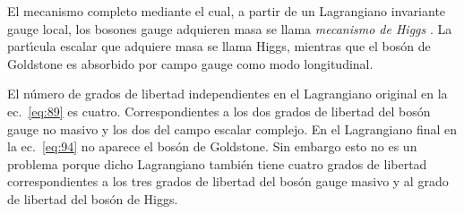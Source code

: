El mecanismo completo mediante el cual, a partir de un Lagrangiano invariante gauge local, los bosones gauge adquieren masa se llama \emph{mecanismo de Higgs} \cite{Higgs:1964pj}. La part\'\i cula escalar que adquiere masa se llama Higgs, mientras que el bos\'on de Goldstone es absorbido por campo gauge como modo longitudinal. 

El n\'umero de grados de libertad independientes en el Lagrangiano original en la ec.~\eqref{eq:89} es cuatro. Correspondientes a los dos grados de libertad del bos\'on gauge no masivo y los dos del campo escalar complejo. En el Lagrangiano final en la ec.~\eqref{eq:94} no aparece el bos\'on de Goldstone. Sin embargo esto no es un problema porque dicho Lagrangiano tambi\'en tiene cuatro grados de libertad correspondientes a  los tres grados de libertad del bos\'on gauge masivo y al grado de libertad del bos\'on de Higgs. 

